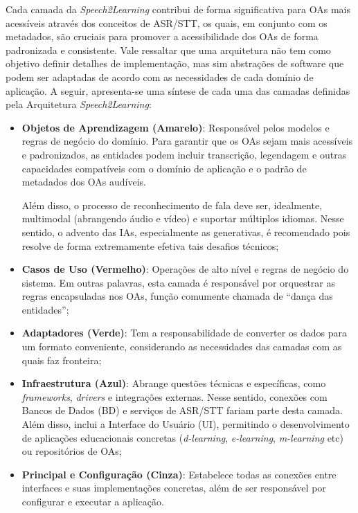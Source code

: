 Cada camada da \textit{Speech2Learning} contribui de forma significativa para OAs mais acessíveis através dos conceitos de ASR/STT, os quais, em conjunto com os metadados, são cruciais para promover a acessibilidade dos OAs de forma padronizada e consistente. Vale ressaltar que uma arquitetura não tem como objetivo definir detalhes de implementação, mas sim abstrações de software que podem ser adaptadas de acordo com as necessidades de cada domínio de aplicação. A seguir, apresenta-se uma síntese de cada uma das camadas definidas pela Arquitetura \textit{Speech2Learning}:

\begin{itemize}
\item \textbf{Objetos de Aprendizagem (Amarelo)}: Responsável pelos modelos e regras de negócio do domínio. Para garantir que os OAs sejam mais acessíveis e padronizados, as entidades podem incluir transcrição, legendagem e outras capacidades compatíveis com o domínio de aplicação e o padrão de metadados dos OAs audíveis. 

Além disso, o processo de reconhecimento de fala deve ser, idealmente, multimodal (abrangendo áudio e vídeo) e suportar múltiplos idiomas. Nesse sentido, o advento das IAs, especialmente as generativas, é recomendado pois resolve de forma extremamente efetiva tais desafios técnicos;
\item \textbf{Casos de Uso (Vermelho)}: Operações de alto nível e regras de negócio do sistema. Em outras palavras, esta camada é responsável por orquestrar as regras encapsuladas nos OAs, função comumente chamada de ``dança das entidades'';
\item \textbf{Adaptadores (Verde)}: Tem a responsabilidade de converter os dados para um formato conveniente, considerando as necessidades das camadas com as quais faz fronteira;
\item \textbf{Infraestrutura (Azul)}: Abrange questões técnicas e específicas, como \textit{frameworks}, \textit{drivers} e integrações externas. Nesse sentido, conexões com Bancos de Dados (BD) e serviços de ASR/STT fariam parte desta camada. Além disso, inclui a Interface do Usuário (UI), permitindo o desenvolvimento de aplicações educacionais concretas (\textit{d-learning}, \textit{e-learning}, \textit{m-learning} etc) ou repositórios de OAs;
\item \textbf{Principal e Configuração (Cinza)}: Estabelece todas as conexões entre interfaces e suas implementações concretas, além de ser responsável por configurar e executar a aplicação.
\end{itemize}

